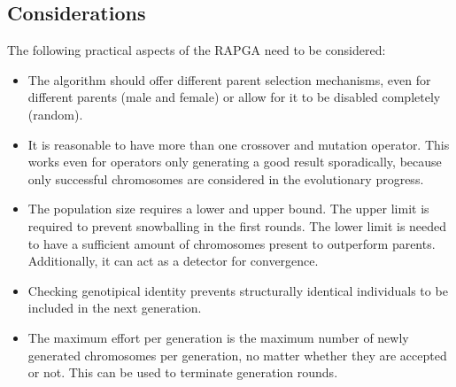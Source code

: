 \documentclass[../main.tex]{subfiles}
\begin{document}
\subsection{Considerations}

The following practical aspects of the RAPGA need to be considered:

\begin{itemize}
    \item The algorithm should offer different parent selection mechanisms, even for different parents (male and female) or allow for it to be disabled completely (random).
    \item It is reasonable to have more than one crossover and mutation operator. This works even for operators only generating a good result sporadically, because only successful chromosomes are considered in the evolutionary progress.
    \item The population size requires a lower and upper bound. The upper limit is required to prevent snowballing in the first rounds. The lower limit is needed to have a sufficient amount of chromosomes present to outperform parents. Additionally, it can act as a detector for convergence.
    \item Checking genotipical identity prevents structurally identical individuals to be included in the next generation.
    \item The maximum effort per generation is the maximum number of newly generated chromosomes per generation, no matter whether they are accepted or not. This can be used to terminate generation rounds.
\end{itemize}
\end{document}
